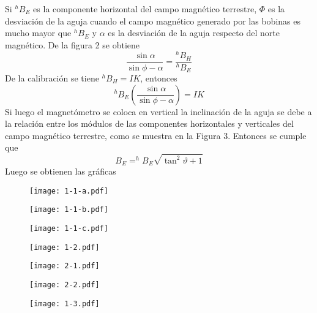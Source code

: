 \documentclass{article}
\begin{document}
Si $^{h}B_E$ es la componente horizontal del campo magnético terrestre, $\Phi $ es la desviación de la aguja cuando el campo magnético generado por las bobinas es mucho mayor que $^{h}B_E$ y $\alpha $ es la desviación de la aguja respecto del norte magnético. De la figura 2 se obtiene
\begin{equation}
	\frac{\sin \alpha }{\sin \phi -\alpha }=\frac{^hB_H}{^hB_E}
\end{equation}
De la calibración se tiene $^hB_H=IK$, entonces
\begin{equation}
	^hB_E\left(\frac{\sin \alpha }{\sin \phi -\alpha }\right)= IK
\end{equation}
Si luego el magnetómetro se coloca en vertical la inclinación de la aguja se debe a la relación entre los módulos de las componentes horizontales y verticales del campo magnético terrestre, como se muestra en la Figura 3.
Entonces se cumple que
\begin{equation}
	B_E=^hB_E \sqrt{\tan^2 \vartheta+1}
\end{equation}
Luego se obtienen las gráficas
\newpage
\begin{figure}[!htpb]
	\centering
	\texttt{[image: 1-1-a.pdf]}
\end{figure}
\begin{figure}[!htpb]
	\centering
	\texttt{[image: 1-1-b.pdf]}
\end{figure}
\begin{figure}[!htpb]
	\centering
	\texttt{[image: 1-1-c.pdf]}
\end{figure}
\begin{figure}[!htpb]
	\centering
	\texttt{[image: 1-2.pdf]}
\end{figure}
\begin{figure}[!htpb]
	\centering
	\texttt{[image: 2-1.pdf]}
\end{figure}
\begin{figure}[!htpb]
	\centering
	\texttt{[image: 2-2.pdf]}
\end{figure}
\begin{figure}[!htpb]
	\centering
	\texttt{[image: 1-3.pdf]}
\end{figure}
\end{document}
